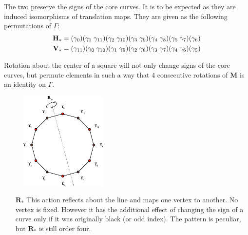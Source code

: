 \documentclass[]{article}
\begin{document}
The two preserve the signs of the core curves. It is to be expected as they are induced isomorphisms of translation maps. They are given as the following permutations of $\Gamma$:
\space
\begin{align*}
\mathbf{H}_* &= (\gamma_0)(\gamma_1\hspace{1mm}\gamma_{11})(\gamma_2\hspace{1mm}\gamma_{10})(\gamma_3\hspace{1mm}\gamma_9)(\gamma_4\hspace{1mm}\gamma_8)(\gamma_5\hspace{1mm}\gamma_7)(\gamma_6)\\
\mathbf{V}_* &=(\gamma_{11})(\gamma_0\hspace{1mm}\gamma_{10})(\gamma_1\hspace{1mm}\gamma_{9})(\gamma_2\hspace{1mm}\gamma_8)(\gamma_3\hspace{1mm}\gamma_7)(\gamma_4\hspace{1mm}\gamma_6)(\gamma_5)
\end{align*}

Rotation about the center of a square will not only change signs of the core curves, but permute elements in such a way that 4 consecutive rotations of $\mathbf{M}$ is an identity on $\Gamma$.

\begin{minipage}{0.4\textwidth}
\begin{figure}[H]
\hspace{0}\includegraphics[width=1.7in]{12gonR.pdf}
\end{figure}
\end{minipage}
\begin{minipage}{0.55\textwidth}
\vspace{0in}
\begin{itemize}
\item[\textbf{\emph{$\mathbf{R}_*$}}] This action reflects about the line and maps one vertex to another. No vertex is fixed. However it has the additional effect of changing the sign of a curve only if it was originally black (or odd index). The pattern is peculiar, but $\mathbf{R}_*$ is still order four.
\end{itemize}
\end{minipage}
\end{document}
